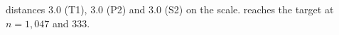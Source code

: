 distances 3.0 (T1), 3.0 (P2) and 3.0 (S2) on the scale.
reaches the target at $n = 1{,}047$ and 333.
